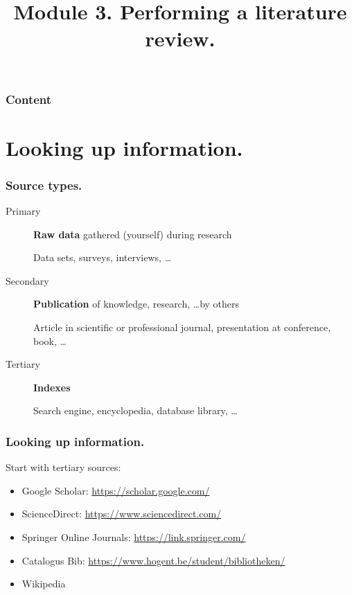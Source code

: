\documentclass[aspectratio=169]{beamer}
\title{Module 3. Performing a literature review.}
\subtitle{\coursename}
\author{\lecturers}   %
\date{\academicyear}
\begin{document}
    
    \begin{frame}
        \maketitle
    \end{frame}
    
    \begin{frame}
        \frametitle{Content}
        
        \tableofcontents
    \end{frame}
    
    \section{Looking up information.}
    
    \begin{frame}
        \frametitle{Source types.}
        
        \begin{description}
            \item[Primary] \textbf{Raw data} gathered (yourself) during research 
            
            Data sets, surveys, interviews, \ldots
            
            \item[Secondary] \textbf{Publication} of knowledge, research, \ldots by others
            
            Article in scientific or professional journal, presentation at conference, book, \ldots
            
            \item[Tertiary] \textbf{Indexes}
            
            Search engine, encyclopedia, database library, \ldots
            
        \end{description}
        
    \end{frame}
    
    \begin{frame}
        \frametitle{Looking up information.}
        
        Start with \alert{tertiary} sources:
        
        \begin{itemize}
            \item Google Scholar: \url{https://scholar.google.com/}
            \item ScienceDirect: \url{https://www.sciencedirect.com/}
            \item Springer Online Journals: \url{https://link.springer.com/}
            \item Catalogus Bib: \url{https://www.hogent.be/student/bibliotheken/}
            \item Wikipedia
        \end{itemize}
    \end{frame}
    
\end{document}
